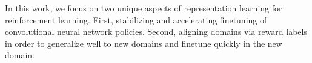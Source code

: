\documentclass[letterpaper, 10 pt, conference, final]{ieeeconf}   %
\begin{document}
In this work, we focus on two unique aspects of representation learning for reinforcement learning. First, stabilizing and accelerating finetuning of convolutional neural network policies. Second, aligning domains via reward labels in order to generalize well to new domains and finetune quickly in the new domain.
\end{document}
